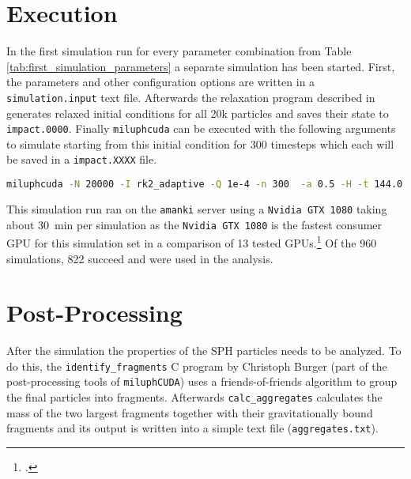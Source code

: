 \section{Execution}

In the first simulation run for every parameter combination from Table \ref{tab:first_simulation_parameters} a separate simulation has been started. First, the parameters and other configuration options are written in a \mbox{\texttt{simulation.input}} text file. Afterwards the relaxation program described in \cite[24\psqq]{Burger2018} generates relaxed initial conditions for all 20k particles and saves their state to \texttt{impact.0000}. Finally \texttt{miluphcuda} can be executed with the following arguments to simulate starting from this initial condition for 300 timesteps which each will be saved in a \texttt{impact.XXXX} file.

\begin{lstlisting}[language=bash,flexiblecolumns=false]
miluphcuda -N 20000 -I rk2_adaptive -Q 1e-4 -n 300  -a 0.5 -H -t 144.0 -f impact.0000 -m material.cfg -s -g
\end{lstlisting}

This simulation run ran on the \texttt{amanki} server using a \texttt{Nvidia GTX 1080} taking about \SI{30}{\minute} per simulation as the \texttt{Nvidia GTX 1080} is the fastest consumer GPU for this simulation set in a comparison of 13 tested GPUs.\footcite{Dorninger} Of the 960 simulations, 822 succeed and were used in the analysis.


\section{Post-Processing}
\label{sec:postprocessing}

After the simulation the properties of the SPH particles needs to be analyzed. To do this, the \texttt{identify\_fragments} C program by Christoph Burger (part of the post-processing tools of \texttt{miluphCUDA}) uses a friends-of-friends algorithm to group the final particles into fragments. Afterwards \texttt{calc\_aggregates} calculates the mass of the two largest fragments together with their gravitationally bound fragments and its output is written into a simple text file (\texttt{aggregates.txt}).


